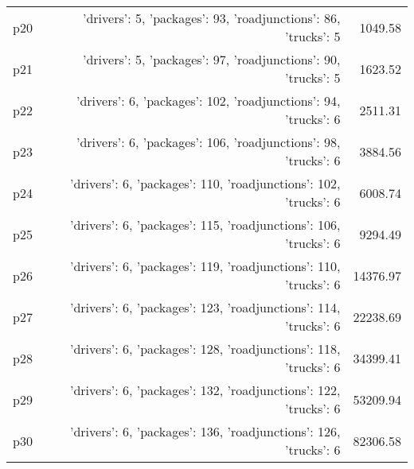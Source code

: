 \documentclass{article}
\begin{document}
\begin{center}
\begin{tabular}{@{}l|r|r@{}}
  p20&{'drivers': 5, 'packages': 93, 'roadjunctions': 86, 'trucks': 5}&1049.58\\
  p21&{'drivers': 5, 'packages': 97, 'roadjunctions': 90, 'trucks': 5}&1623.52\\
  p22&{'drivers': 6, 'packages': 102, 'roadjunctions': 94, 'trucks': 6}&2511.31\\
  p23&{'drivers': 6, 'packages': 106, 'roadjunctions': 98, 'trucks': 6}&3884.56\\
  p24&{'drivers': 6, 'packages': 110, 'roadjunctions': 102, 'trucks': 6}&6008.74\\
  p25&{'drivers': 6, 'packages': 115, 'roadjunctions': 106, 'trucks': 6}&9294.49\\
  p26&{'drivers': 6, 'packages': 119, 'roadjunctions': 110, 'trucks': 6}&14376.97\\
  p27&{'drivers': 6, 'packages': 123, 'roadjunctions': 114, 'trucks': 6}&22238.69\\
  p28&{'drivers': 6, 'packages': 128, 'roadjunctions': 118, 'trucks': 6}&34399.41\\
  p29&{'drivers': 6, 'packages': 132, 'roadjunctions': 122, 'trucks': 6}&53209.94\\
  p30&{'drivers': 6, 'packages': 136, 'roadjunctions': 126, 'trucks': 6}&82306.58
                            \end{tabular}
                            \end{center}
                    
\end{document}
